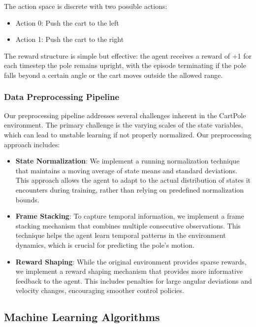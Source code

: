 \documentclass[conference]{IEEEtran}
\begin{document}
The action space is discrete with two possible actions:
\begin{itemize}
    \item Action 0: Push the cart to the left
    \item Action 1: Push the cart to the right
\end{itemize}

The reward structure is simple but effective: the agent receives a reward of +1 for each timestep the pole remains upright, with the episode terminating if the pole falls beyond a certain angle or the cart moves outside the allowed range.

\subsubsection{Data Preprocessing Pipeline}
Our preprocessing pipeline addresses several challenges inherent in the CartPole environment. The primary challenge is the varying scales of the state variables, which can lead to unstable learning if not properly normalized. Our preprocessing approach includes:

\begin{itemize}
    \item \textbf{State Normalization}: We implement a running normalization technique that maintains a moving average of state means and standard deviations. This approach allows the agent to adapt to the actual distribution of states it encounters during training, rather than relying on predefined normalization bounds.
    
    \item \textbf{Frame Stacking}: To capture temporal information, we implement a frame stacking mechanism that combines multiple consecutive observations. This technique helps the agent learn temporal patterns in the environment dynamics, which is crucial for predicting the pole's motion.
    
    \item \textbf{Reward Shaping}: While the original environment provides sparse rewards, we implement a reward shaping mechanism that provides more informative feedback to the agent. This includes penalties for large angular deviations and velocity changes, encouraging smoother control policies.
\end{itemize}

\subsection{Machine Learning Algorithms}
\end{document}
